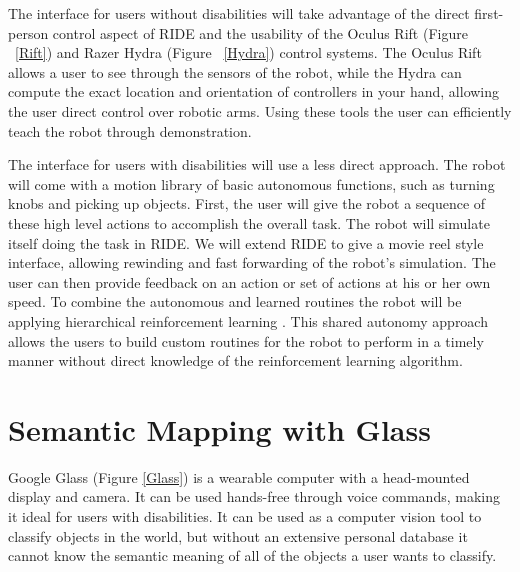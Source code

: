 \documentclass{acm_proc_article-sp}
\begin{document}
The interface for users without disabilities will take advantage of the direct first-person control aspect of RIDE and the usability of the Oculus Rift (Figure ~\ref{Rift}) and Razer Hydra (Figure ~\ref{Hydra}) control systems. The Oculus Rift allows a user to see through the sensors of the robot, while the Hydra can compute the exact location and orientation of controllers in your hand, allowing the user direct control over robotic arms. Using these tools the user can efficiently teach the robot through demonstration.

The interface for users with disabilities will use a less direct approach. The robot will come with a motion library of basic autonomous functions, such as turning knobs and picking up objects. First, the user will give the robot a sequence of these high level actions to accomplish the overall task. The robot will simulate itself doing the task in RIDE. We will extend RIDE to give a movie reel style interface, allowing rewinding and fast forwarding of the robot's simulation. The user can then provide feedback on an action or set of actions at his or her own speed. To combine the autonomous and learned routines the robot will be applying hierarchical reinforcement learning  \cite{Barto:2003:RAH:608557.608576}. This shared autonomy approach allows the users to build custom routines for the robot to perform in a timely manner without direct knowledge of the reinforcement learning algorithm.

\section{Semantic Mapping with Glass}
\label{Object Classification}
Google Glass (Figure \ref{Glass}) is a wearable computer with a head-mounted display and camera. It can be used hands-free through voice commands, making it ideal for users with disabilities. It can be used as a computer vision tool to classify objects in the world, but without an extensive personal database it cannot know the semantic meaning of all of the objects a user wants to classify. 
\end{document}
